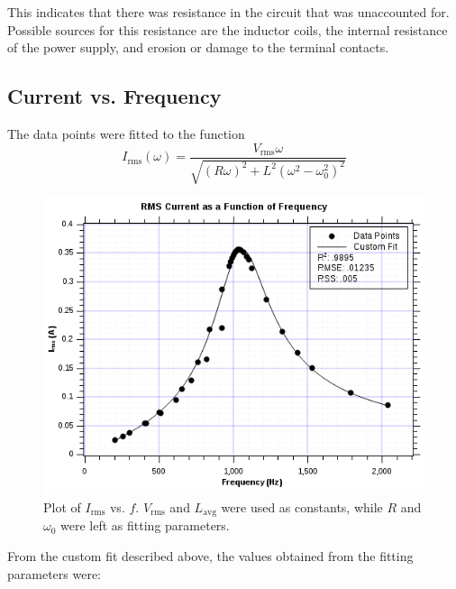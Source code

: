 \documentclass[twocolumn,english]{IEEEtran}
\theoremstyle{plain}
\theoremstyle{plain}
\begin{document}
This indicates that there was resistance in the circuit that was unaccounted for. Possible sources for this resistance are the inductor coils, the internal resistance of the power supply, and erosion or damage to the terminal contacts.

\hrulefill

\subsection{Current vs. Frequency}


The data points were fitted to the function
\begin{equation}
	I_{\text{rms}}(\omega)
	= \frac
	{V_{\text{rms}}\omega}
	{\sqrt{(R\omega)^2 +L^2(\omega^2-\omega_0^2)^2}}
\end{equation}

\begin{figure}[H]
	\begin{centering}
	\begin{center}
	\includegraphics[width=\linewidth]{./Part3.png}
	\caption{Plot of $I_{\text{rms}}$ vs. $f$. $V_{\text{rms}}$ and $L_{\text{avg}}$ were used as constants, while $R$ and $\omega_0$ were left as fitting parameters.}
	\label{fig:IvsFreq}
	\end{center}
	\par\end{centering}
\end{figure}

From the custom fit described above, the values obtained from the fitting parameters were:
\end{document}
